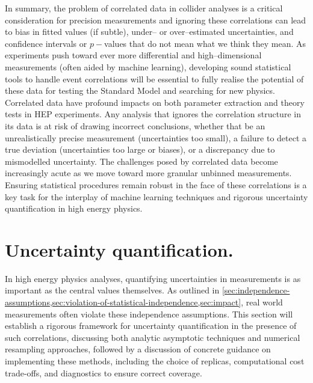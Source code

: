     In summary, the problem of correlated data in collider analyses is a critical consideration for precision measurements and ignoring these correlations can lead to bias in fitted values (if subtle), under-- or over--estimated uncertainties, and confidence intervals or $p-$values that do not mean what we think they mean.
    As experiments push toward ever more differential and high--dimensional measurements (often aided by machine learning), developing sound statistical tools to handle event correlations will be essential to fully realise the potential of these data for testing the Standard Model and searching for new physics.
    Correlated data have profound impacts on both parameter extraction and theory tests in HEP experiments.
    Any analysis that ignores the correlation structure in its data is at risk of drawing incorrect conclusions, whether that be an unrealistically precise measurement (uncertainties too small), a failure to detect a true deviation (uncertainties too large or biases), or a discrepancy due to mismodelled uncertainty.
    The challenges posed by correlated data become increasingly acute as we move toward more granular unbinned measurements.
    Ensuring statistical procedures remain robust in the face of these correlations is a key task for the interplay of machine learning techniques and rigorous uncertainty quantification in high energy physics.
    
\section{Uncertainty quantification.}
\label{sec:uncertainty-quant}
\sectionminitoc
    In high energy physics analyses, quantifying uncertainties in measurements is as important as the central values themselves.
    As outlined in \cref{sec:independence-assumptions,sec:violation-of-statistical-independence,sec:impact}, real world measurements often violate these independence assumptions.
    This section will establish a rigorous framework for uncertainty quantification in the presence of such correlations, discussing both analytic asymptotic techniques and numerical resampling approaches, followed by a discussion of concrete guidance on implementing these methods, including the choice of replicas, computational cost trade-offs, and diagnostics to ensure correct coverage.
    
